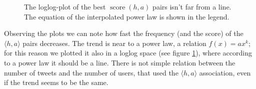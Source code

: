 \documentclass[a4paper,11pt,oneside]{article}
\DeclareMathOperator{\score}{score}
\newcommand{\ha}{$\langle h,a \rangle$\xspace}
\newcommand{\sha}{$\score(h,a)$\xspace}
\begin{document}
\begin{figure}[h!]
\centering
{}
\caption{The loglog-plot of the best \sha pairs isn't far from a line. The equation of the interpolated power law is shown in the legend.}
\label{fig:loglogPlot}
\end{figure}

Observing the plots we can note how fast the frequency (and the score) of the \ha pairs decreases. The trend is near to a power law, a relation $f(x) = ax^k$; for this reason we plotted it also in a loglog space (see figure \ref{fig:loglogPlot}), where according to a power law it should be a line.
There is not simple relation between the number of tweets and the number of users, that used the \ha association, even if the trend seems to be the same.


\end{document}
